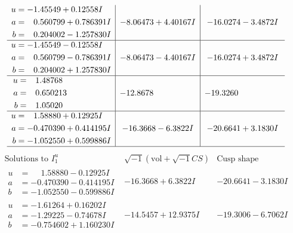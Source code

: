 \documentclass[1p]{elsarticle_modified}
\theoremstyle{definition}
\newcommand{\I}{\sqrt{-1}}
\begin{document}
$$\begin{array}{c|c|c}
\begin{aligned}
u &= -1.45549 + 0.12558 I \\
a &= \phantom{-}0.560799 + 0.786391 I \\
b &= \phantom{-}0.204002 - 1.257830 I\end{aligned}
 & -8.06473 + 4.40167 I & -16.0274 - 3.4872 I \\ \hline\begin{aligned}
u &= -1.45549 - 0.12558 I \\
a &= \phantom{-}0.560799 - 0.786391 I \\
b &= \phantom{-}0.204002 + 1.257830 I\end{aligned}
 & -8.06473 - 4.40167 I & -16.0274 + 3.4872 I \\ \hline\begin{aligned}
u &= \phantom{-}1.48768\phantom{ +0.000000I} \\
a &= \phantom{-}0.650213\phantom{ +0.000000I} \\
b &= \phantom{-}1.05020\phantom{ +0.000000I}\end{aligned}
 & -12.8678\phantom{ +0.000000I} & -19.3260\phantom{ +0.000000I} \\ \hline\begin{aligned}
u &= \phantom{-}1.58880 + 0.12925 I \\
a &= -0.470390 + 0.414195 I \\
b &= -1.052550 + 0.599886 I\end{aligned}
 & -16.3668 - 6.3822 I & -20.6641 + 3.1830 I\\
 \hline 
 \end{array}$$\newpage$$\begin{array}{c|c|c}  
\text{Solutions to }I^u_{1}& \I (\text{vol} + \sqrt{-1}CS) & \text{Cusp shape}\\
 \hline 
\begin{aligned}
u &= \phantom{-}1.58880 - 0.12925 I \\
a &= -0.470390 - 0.414195 I \\
b &= -1.052550 - 0.599886 I\end{aligned}
 & -16.3668 + 6.3822 I & -20.6641 - 3.1830 I \\ \hline\begin{aligned}
u &= -1.61264 + 0.16202 I \\
a &= -1.29225 - 0.74678 I \\
b &= -0.754602 + 1.160230 I\end{aligned}
 & -14.5457 + 12.9375 I & -19.3006 - 6.7062 I \\ \hline\begin{aligned}

\end{aligned}
\end{array}$$
\end{document}
